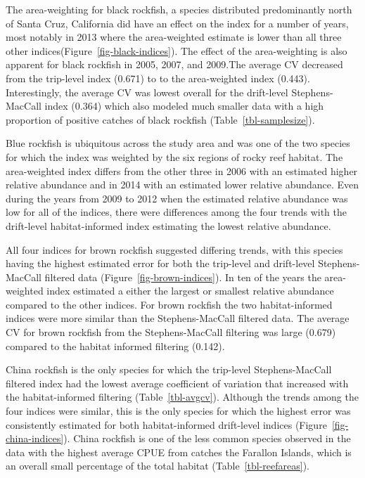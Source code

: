 \documentclass[
  12pt,
  authoryear,
  preprint,
  3p]{elsarticle}
\begin{document}
The area-weighting for black rockfish, a species distributed
predominantly north of Santa Cruz, California did have an effect on the
index for a number of years, most notably in 2013 where the
area-weighted estimate is lower than all three other
indices(Figure~\ref{fig-black-indices}). The effect of the
area-weighting is also apparent for black rockfish in 2005, 2007, and
2009.The average CV decreased from the trip-level index (0.671) to to
the area-weighted index (0.443). Interestingly, the average CV was
lowest overall for the drift-level Stephens-MacCall index (0.364) which
also modeled much smaller data with a high proportion of positive
catches of black rockfish (Table~\ref{tbl-samplesize}).

Blue rockfish is ubiquitous across the study area and was one of the two
species for which the index was weighted by the six regions of rocky
reef habitat. The area-weighted index differs from the other three in
2006 with an estimated higher relative abundance and in 2014 with an
estimated lower relative abundance. Even during the years from 2009 to
2012 when the estimated relative abundance was low for all of the
indices, there were differences among the four trends with the
drift-level habitat-informed index estimating the lowest relative
abundance.

All four indices for brown rockfish suggested differing trends, with
this species having the highest estimated error for both the trip-level
and drift-level Stephens-MacCall filtered data
(Figure~\ref{fig-brown-indices}). In ten of the years the area-weighted
index estimated a either the largest or smallest relative abundance
compared to the other indices. For brown rockfish the two
habitat-informed indices were more similar than the Stephens-MacCall
filtered data. The average CV for brown rockfish from the
Stephens-MacCall filtering was large (0.679) compared to the habitat
informed filtering (0.142).

China rockfish is the only species for which the trip-level
Stephens-MacCall filtered index had the lowest average coefficient of
variation that increased with the habitat-informed filtering
(Table~\ref{tbl-avgcv}). Although the trends among the four indices were
similar, this is the only species for which the highest error was
consistently estimated for both habitat-informed drift-level indices
(Figure~\ref{fig-china-indices}). China rockfish is one of the less
common species observed in the data with the highest average CPUE from
catches the Farallon Islands, which is an overall small percentage of
the total habitat (Table~\ref{tbl-reefareas}).
\end{document}
